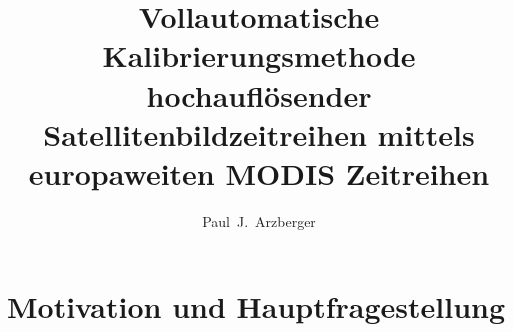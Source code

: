 \documentclass[11pt]{report}
\author{Paul~J.~Arzberger}
\title{Vollautomatische Kalibrierungsmethode hochauflösender Satellitenbildzeitreihen mittels europaweiten MODIS Zeitreihen}
\begin{document}
\maketitle

\tableofcontents
% 
% 
%
%
\chapter{Motivation und Hauptfragestellung}
\end{document}
